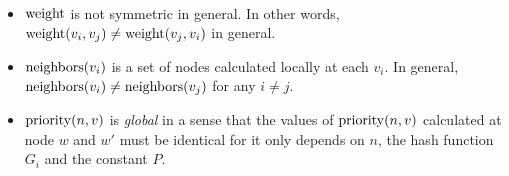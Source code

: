 \begin{rem}
    $ $
    \begin{itemize}
        \item
            $\operatorname{weight}$ is not symmetric in general.
            In other words, $\operatorname{weight}(v_i, v_j) \ne \operatorname{weight}(v_j, v_i)$ in general.
        \item
            $\operatorname{neighbors}(v_i)$ is a set of nodes calculated locally at each $v_i$.
            In general, $\operatorname{neighbors}(v_i) \ne \operatorname{neighbors}(v_j)$ for any $i \ne j$.
        \item
            $\operatorname{priority}(n, v)$ is \textit{global} in a sense that the values of $\operatorname{priority}(n, v)$ calculated at node $w$ and $w'$ must be identical for it only depends on $n$, the hash function $G_i$ and the constant $P$.
    \end{itemize}
\end{rem}

